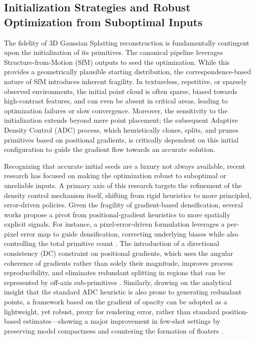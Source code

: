 \documentclass[11pt,a4paper]{article}
\begin{document}
\subsection{Initialization Strategies and Robust Optimization from Suboptimal Inputs}


The fidelity of 3D Gaussian Splatting reconstruction is fundamentally contingent upon the initialization of its primitives. The canonical pipeline leverages Structure-from-Motion (SfM) outputs to seed the optimization. While this provides a geometrically plausible starting distribution, the correspondence-based nature of SfM introduces inherent fragility. In textureless, repetitive, or sparsely observed environments, the initial point cloud is often sparse, biased towards high-contrast features, and can even be absent in critical areas, leading to optimization failures or slow convergence. Moreover, the sensitivity to the initialization extends beyond mere point placement; the subsequent Adaptive Density Control (ADC) process, which heuristically clones, splits, and prunes primitives based on positional gradients, is critically dependent on this initial configuration to guide the gradient flow towards an accurate solution.

Recognizing that accurate initial seeds are a luxury not always available, recent research has focused on making the optimization robust to suboptimal or unreliable inputs. A primary axis of this research targets the refinement of the density control mechanism itself, shifting from rigid heuristics to more principled, error-driven policies. Given the fragility of gradient-based densification, several works propose a pivot from positional-gradient heuristics to more spatially explicit signals. For instance, a pixel-error-driven formulation leverages a per-pixel error map to guide densification, correcting underlying biases while also controlling the total primitive count \cite{arxiv:2404.06109v1}. The introduction of a directional consistency (DC) constraint on positional gradients, which uses the angular coherence of gradients rather than solely their magnitude, improves process reproducibility, and eliminates redundant splitting in regions that can be represented by off-axis sub-primitives \cite{arxiv:2510.26921v1}. Similarly, drawing on the analytical insight that the standard ADC heuristic is also prone to generating redundant points, a framework based on the gradient of opacity can be adopted as a lightweight, yet robust, proxy for rendering error, rather than standard position-based estimates---showing a major improvement in few-shot settings by preserving model compactness and countering the formation of floaters \cite{arxiv:2510.10257v1}.
\end{document}
